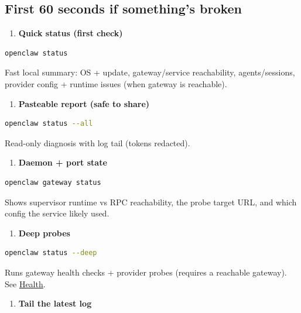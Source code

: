 

\subsection{First 60 seconds if something's broken}


\begin{enumerate}
  \item \textbf{Quick status (first check)}
\end{enumerate}


\begin{lstlisting}[language=bash]
   openclaw status
\end{lstlisting}


Fast local summary: OS + update, gateway/service reachability, agents/sessions, provider config + runtime issues (when gateway is reachable).

\begin{enumerate}
  \item \textbf{Pasteable report (safe to share)}
\end{enumerate}


\begin{lstlisting}[language=bash]
   openclaw status --all
\end{lstlisting}


Read-only diagnosis with log tail (tokens redacted).

\begin{enumerate}
  \item \textbf{Daemon + port state}
\end{enumerate}


\begin{lstlisting}[language=bash]
   openclaw gateway status
\end{lstlisting}


Shows supervisor runtime vs RPC reachability, the probe target URL, and which config the service likely used.

\begin{enumerate}
  \item \textbf{Deep probes}
\end{enumerate}


\begin{lstlisting}[language=bash]
   openclaw status --deep
\end{lstlisting}


Runs gateway health checks + provider probes (requires a reachable gateway). See \href{/gateway/health}{Health}.

\begin{enumerate}
  \item \textbf{Tail the latest log}
\end{enumerate}


